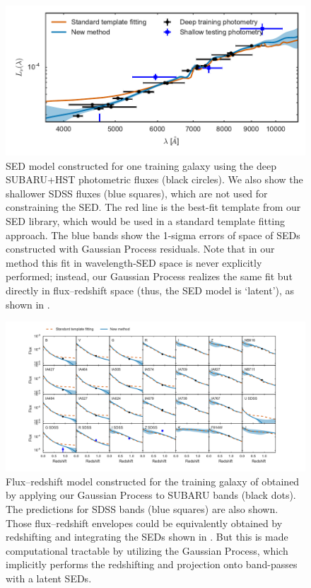 \documentclass[aps,prd,showpacs,superscriptaddress,groupedaddress]{revtex4}  %
\begin{document}
\begin{figure}
\includegraphics[width=12cm]{traininggalaxy_fnulambda-6.pdf}
\caption{SED model constructed for one training galaxy using the deep SUBARU+HST photometric fluxes (black circles). We also show the shallower SDSS fluxes (blue squares), which are not used for constraining the SED. The red line is the best-fit template from our SED library, which would be used in a standard template fitting approach. The blue bands show the 1-sigma errors of space of SEDs constructed with Gaussian Process residuals. Note that in our method this fit in wavelength-SED space is never explicitly performed; instead, our Gaussian Process realizes the same fit but directly in flux--redshift space (thus, the SED model is `latent'), as shown in .}
\label{fig:traininggalaxy_fnulambda}
\end{figure}

\begin{figure}
\includegraphics[width=18cm, trim = 2cm 0cm 2cm 0cm, clip]{traininggalaxy_fluxredshiftmodel-6.pdf}
\caption{Flux--redshift model constructed for the training galaxy of  obtained by applying our Gaussian Process to SUBARU bands (black dots). The predictions for SDSS bands (blue squares) are also shown. Those flux--redshift envelopes could be equivalently obtained by redshifting and integrating the SEDs shown in . But this is made computational tractable by utilizing the Gaussian Process, which implicitly performs the redshifting and projection onto band-passes with a latent SEDs.}
\label{fig:traininggalaxy_fluxredshiftmodel}
\end{figure} 
\end{document}
